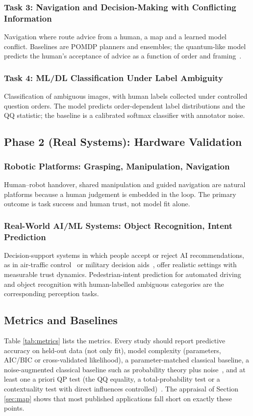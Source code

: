 \documentclass[pdflatex,sn-basic]{sn-jnl}
\begin{document}
\subsubsection{Task 3: Navigation and Decision-Making with Conflicting Information}
Navigation where route advice from a human, a map and a learned model conflict. Baselines are POMDP planners and ensembles; the quantum-like model predicts the human's acceptance of advice as a function of order and framing~\citep{Song2022,Roeder2023}.

\subsubsection{Task 4: ML/DL Classification Under Label Ambiguity}
Classification of ambiguous images, with human labels collected under controlled question orders. The model predicts order-dependent label distributions and the QQ statistic; the baseline is a calibrated softmax classifier with annotator noise.

\subsection{Phase 2 (Real Systems): Hardware Validation}

\subsubsection{Robotic Platforms: Grasping, Manipulation, Navigation}
Human--robot handover, shared manipulation and guided navigation are natural platforms because a human judgement is embedded in the loop. The primary outcome is task success and human trust, not model fit alone.

\subsubsection{Real-World AI/ML Systems: Object Recognition, Intent Prediction}
Decision-support systems in which people accept or reject AI recommendations, as in air-traffic control~\citep{Pushparaj2021} or military decision aids~\citep{Humr2026}, offer realistic settings with measurable trust dynamics. Pedestrian-intent prediction for automated driving~\citep{Song2022} and object recognition with human-labelled ambiguous categories are the corresponding perception tasks.

\subsection{Metrics and Baselines}\label{sec:metrics}
Table \ref{tab:metrics} lists the metrics. Every study should report predictive accuracy on held-out data (not only fit), model complexity (parameters, AIC/BIC or cross-validated likelihood), a parameter-matched classical baseline, a noise-augmented classical baseline such as probability theory plus noise~\citep{Costello2014}, and at least one a priori QP test (the QQ equality, a total-probability test or a contextuality test with direct influences controlled)~\citep{Dzhafarov2016a}. The appraisal of Section \ref{sec:map} shows that most published applications fall short on exactly these points.
\end{document}
